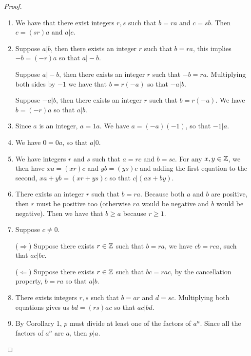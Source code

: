 \begin{proof}
 \begin{enumerate}
    \item We have that there exist integers $r,s$ such that $b=ra$ and $c=sb$. Then $c=(sr)a$ and $a\vert c$.
    \item Suppose $a\vert b$, then there exists an integer $r$ such that $b=ra$, this implies $-b=(-r)a$ so that $a\vert -b$.

    Suppose $a\vert -b$, then there exists an integer $r$ such that $-b=ra$. Multiplying both sides by $-1$ we have that $b=r(-a)$ so that $-a\vert b$.

    Suppose $-a\vert b$, then there exists an integer $r$ such that $b=r(-a)$. We have $b=(-r)a$ so that $a\vert b$.
    \item Since $a$ is an integer, $a=1a$. We have $a=(-a)(-1)$, so that $-1\vert a$.
    \item We have $0=0a$, so that $a\vert 0$.
    \item We have integers $r$ and $s$ such that $a=rc$ and $b=sc$. For any $x,y\in\mathbb{Z}$, we then have $xa=(xr)c$ and $yb=(ys)c$ and adding the first equation to the second, $xa+yb=(xr+ys)c$ so that $c\vert (ax+by)$.
    \item There exists an integer $r$ such that $b=ra$. Because both $a$ and $b$ are positive, then $r$ must be positive too (otherwise $ra$ would be negative and $b$ would be negative). Then we have that $b\geq a$ because $r\geq 1$.
    \item Suppose $c\neq 0$.

    ($\Rightarrow$) Suppose there exists $r\in\mathbb{Z}$ such that $b=ra$, we have $cb=rca$, such that $ac\vert bc$.

    ($\Leftarrow$) Suppose there exists $r\in\mathbb{Z}$ such that $bc=rac$, by the cancellation property, $b=ra$ so that $a\vert b$.
    \item There exists integers $r,s$ such that $b=ar$ and $d=sc$. Multiplying both equations gives us $bd=(rs)ac$ so that $ac\vert bd$.
    \item By Corollary 1, $p$ must divide at least one of the factors of $a^{n}$. Since all the factors of $a^{n}$ are $a$, then $p\vert a$.
\end{enumerate}
\end{proof}


